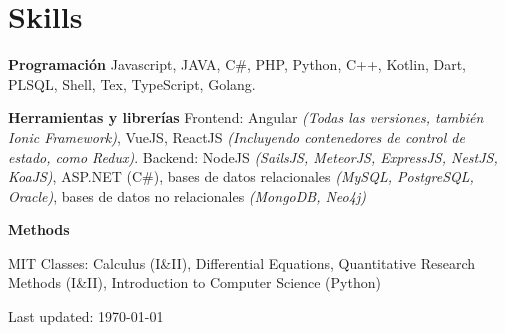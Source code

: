 \documentclass[letterpaper]{article}
\renewenvironment{itemize}{
  \begin{list}{}{
    \setlength{\leftmargin}{1.5em}
  }
}{
  \end{list}
}
\begin{document}
\section*{Skills}
\begin{itemize}
\item {\bf Programaci\'on}
\subitem Javascript, JAVA, C\#, PHP, Python, C++, Kotlin, Dart, PLSQL, Shell, Tex, TypeScript, Golang.

\item {\bf Herramientas y librer\'ias}
\subitem Frontend: Angular \textit{(Todas las versiones, tambi\'en Ionic Framework)}, VueJS, ReactJS \textit{(Incluyendo contenedores de control de estado, como Redux)}.
\subitem Backend: NodeJS \textit{(SailsJS, MeteorJS, ExpressJS, NestJS, KoaJS)}, ASP.NET (C\#),  bases de datos relacionales \textit{(MySQL, PostgreSQL, Oracle)}, bases de datos no relacionales \textit{(MongoDB, Neo4j)}

\item {\bf Methods}

\leftskip 0.5in
\parindent -0.5in

\subitem MIT Classes: Calculus (I\&II), Differential Equations, Quantitative Research Methods (I\&II), Introduction to Computer Science (Python) 

\end{itemize}

\bigskip

\begin{center}
  \begin{footnotesize}
    Last updated: \today \\
  \end{footnotesize}
\end{center}
\end{document}
